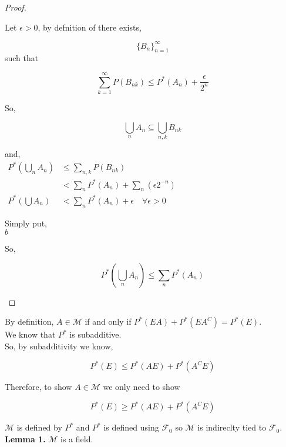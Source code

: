 \documentclass[11pt,fleqn]{book} %
\begin{document}
\begin{proof}
\begin{enumerate}[label = (\roman*)]
		Let $\epsilon > 0$, by defnition of  there exists, 

		$$ \{B_n\}^\infty_{n=1}  $$ such that

		$$\displaystyle \sum^\infty_{k=1} P(B_{nk}) \leq P^*(A_n) + \frac{\epsilon}{2^n} $$

		So, 

		$$\bigcup_n A_n \subseteq \bigcup_{n,k} B_{nk} $$

		and,\\

		$\begin{aligned}
			P^*(\bigcup_n A_n) &\leq \displaystyle \sum_{n,k} P(B_{nk})\\ 
			&< \displaystyle \sum_n P^* (A_n) + \sum_n (\epsilon 2^{-n})\\
			P^*(\bigcup A_n) &< \sum_n P^* (A_n) + \epsilon \quad \forall \epsilon > 0
		\end{aligned}$

		Simply put, \\
		$ b$

		So, 

		$$P^*(\bigcup_n A_n) \leq \sum_n P^*(A_n) $$
 	\end{enumerate}
\end{proof}

By definition, $A \in \mathcal{M}$ if and only if $P^*(EA) + P^*(EA^C) = P^*(E)$. \\

We know that $P^*$ is subadditive. \\

So, by subadditivity we know, 

$$P^*(E) \leq P^*(AE) + P^*(A^C E) $$

Therefore, to show $A \in \mathcal{M}$ we only need to show 

$$P^*(E) \geq P^*(AE) + P^*(A^C E) $$


$\mathcal{M}$ is defined by $P^*$ and $P^*$ is defined using $\mathcal{F}_0$ so $\mathcal{M}$ is indireclty tied to $\mathcal{F}_0$.\\

\textbf{Lemma 1.} $\mathcal{M}$ is a field.
\end{document}
